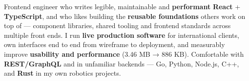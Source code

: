 
\begin{cvparagraph}
Frontend engineer who writes legible, maintainable and \textbf{performant} \textbf{React} + \textbf{TypeScript}, and who likes building the \textbf{reusable foundations} others work on top of --- component libraries, shared tooling and frontend standards across multiple front ends. I run \textbf{live production software} for international clients, own interfaces end to end from wireframe to deployment, and measurably improve \textbf{usability and performance} (3.46 MB → 886 KB). Comfortable with \textbf{REST/GraphQL} and in unfamiliar backends --- Go, Python, Node.js, C++, and \textbf{Rust} in my own robotics projects.
\end{cvparagraph}
